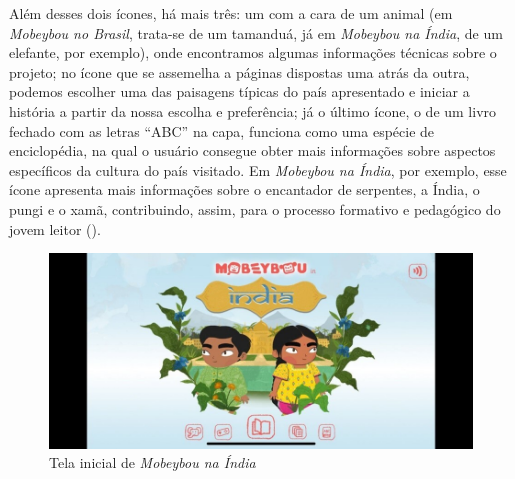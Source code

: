 \documentclass[portuguese]{textolivre}
\begin{document}
Além desses dois ícones, há mais três: um com a cara de um animal (em
\textit{Mobeybou no Brasil}, trata-se de um tamanduá, já em \textit{Mobeybou na
Índia}, de um elefante, por exemplo), onde encontramos algumas informações
técnicas sobre o projeto; no ícone que se assemelha a páginas dispostas uma
atrás da outra, podemos escolher uma das paisagens típicas do país apresentado
e iniciar a história a partir da nossa escolha e preferência; já o último
ícone, o de um livro fechado com as letras “ABC” na capa, funciona como uma
espécie de enciclopédia, na qual o usuário consegue obter mais informações
sobre aspectos específicos da cultura do país visitado. Em \textit{Mobeybou na
Índia}, por exemplo, esse ícone apresenta mais informações sobre o encantador
de serpentes, a Índia, o pungi e o xamã, contribuindo, assim, para o processo
formativo e pedagógico do jovem leitor ().

\begin{figure}[htbp]
  \centering
  \begin{minipage}{.85\textwidth}
    \includegraphics[width=\linewidth]{Fig4.jpeg}
    \caption{Tela inicial de \textit{Mobeybou na Índia}}
    \label{fig4}
  \end{minipage}
\end{figure}
\end{document}
